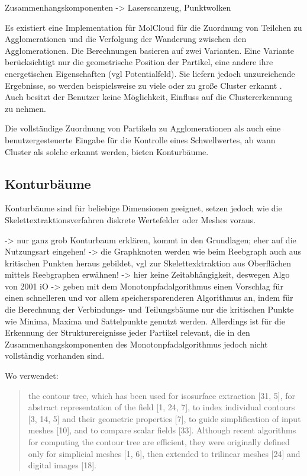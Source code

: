 Zusammenhangskomponenten -> Laserscanzeug, Punktwolken

Es existiert eine Implementation für MolCloud für die Zuordnung von Teilchen zu Agglomerationen und die Verfolgung der Wanderung zwischen den Agglomerationen. Die Berechnungen basieren auf zwei Varianten. Eine Variante berücksichtigt nur die geometrische Position der Partikel, eine andere ihre energetischen Eigenschaften (vgl Potentialfeld). Sie liefern jedoch unzureichende Ergebnisse, so werden beispielsweise zu viele oder zu große Cluster erkannt \cite{vis07grottel}. Auch besitzt der Benutzer keine Möglichkeit, Einfluss auf die Clustererkennung zu nehmen.

Die vollständige Zuordnung von Partikeln zu Agglomerationen als auch eine benutzergesteuerte Eingabe für die Kontrolle eines Schwellwertes, ab wann Cluster als solche erkannt werden, bieten Konturbäume.

\subsection{Konturbäume}

Konturbäume sind für beliebige Dimensionen geeignet, setzen jedoch wie die Skelettextraktionsverfahren diskrete Wertefelder oder Meshes voraus.

-> nur ganz grob Konturbaum erklären, kommt in den Grundlagen; eher auf die Nutzungsart eingehen!
-> die Graphknoten werden wie beim Reebgraph auch aus kritischen Punkten heraus gebildet, vgl zur Skelettexktraktion aus Oberflächen mittels Reebgraphen erwähnen!
-> hier keine Zeitabhängigkeit, deswegen Algo von 2001 iO
-> \cite{chiang2005contourTreesUsingMonotonePaths} geben mit dem Monotonpfadalgorithmus einen Vorschlag für einen schnelleren und vor allem speichersparenderen Algorithmus an, indem für die Berechnung der Verbindungs- und Teilungsbäume nur die kritischen Punkte wie Minima, Maxima und Sattelpunkte genutzt werden. Allerdings ist für die Erkennung der Strukturereignisse jeder Partikel relevant, die in den Zusammenhangskomponenten des Monotonpfadalgorithmus jedoch nicht vollständig vorhanden sind.

Wo verwendet:
\blockcquote[1]{carr2009representingInterpolantTopology}{the contour tree, which has been used for isosurface extraction [31, 5], for abstract representation of the field [1, 24, 7], to index individual contours [3, 14, 5] and their geometric properties [7], to guide simplification of input meshes [10], and to compare scalar fields [33].
Although recent algorithms for computing the contour tree are efficient, they were originally defined only for simplicial meshes [1, 6], then extended to trilinear meshes [24] and digital images [18].}

